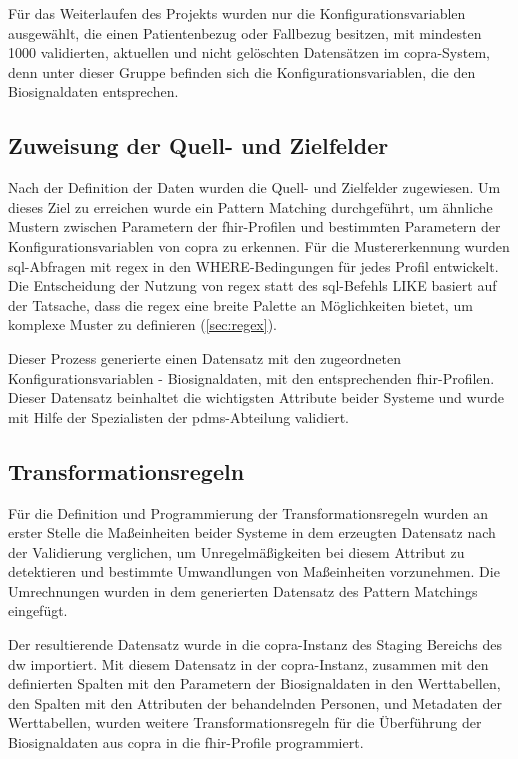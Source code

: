 Für das Weiterlaufen des Projekts wurden nur die Konfigurationsvariablen ausgewählt, die einen Patientenbezug oder Fallbezug besitzen, mit mindesten 1000 validierten, aktuellen und nicht gelöschten Datensätzen im \ac{copra}-System, denn unter dieser Gruppe befinden sich die Konfigurationsvariablen, die den Biosignaldaten entsprechen.

\subsection{Zuweisung der Quell- und Zielfelder} \label{sec:patternmatchingicucopra}

Nach der Definition der Daten wurden die Quell- und Zielfelder zugewiesen. Um dieses Ziel zu erreichen wurde ein Pattern Matching durchgeführt, um ähnliche Mustern zwischen Parametern der \ac{fhir}-Profilen und bestimmten Parametern der Konfigurationsvariablen von \ac{copra} zu erkennen. Für die Mustererkennung wurden \ac{sql}-Abfragen mit \ac{regex} in den WHERE-Bedingungen für jedes Profil entwickelt. Die Entscheidung der Nutzung von \ac{regex} statt des \ac{sql}-Befehls \glqq LIKE\grqq{} basiert auf der Tatsache, dass die \ac{regex} eine breite Palette an Möglichkeiten bietet, um komplexe Muster zu definieren (\ref{sec:regex}).

Dieser Prozess generierte einen Datensatz mit den zugeordneten Konfigurationsvariablen - Biosignaldaten, mit den entsprechenden \ac{fhir}-Profilen. Dieser Datensatz beinhaltet die wichtigsten Attribute beider Systeme und wurde mit Hilfe der Spezialisten der \ac{pdms}-Abteilung validiert.

\subsection{Transformationsregeln} \label{sec:transformrules}

Für die Definition und Programmierung der Transformationsregeln wurden an erster Stelle die Maßeinheiten beider Systeme in dem erzeugten Datensatz nach der Validierung verglichen, um Unregelmäßigkeiten bei diesem Attribut zu detektieren und bestimmte Umwandlungen von Maßeinheiten vorzunehmen. Die Umrechnungen wurden in dem generierten Datensatz des Pattern Matchings eingefügt.

Der resultierende Datensatz wurde in die \ac{copra}-Instanz des Staging Bereichs des \ac{dw} importiert. Mit diesem Datensatz in der \ac{copra}-Instanz, zusammen mit den definierten Spalten mit den Parametern der Biosignaldaten in den Werttabellen, den Spalten mit den Attributen der behandelnden Personen, und Metadaten der Werttabellen, wurden weitere Transformationsregeln für die Überführung der Biosignaldaten aus \ac{copra} in die \ac{fhir}-Profile programmiert.

